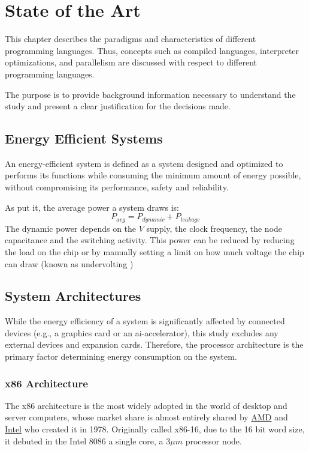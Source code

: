 \chapter{State of the Art}\label{chap:state-of-the-art}

This chapter describes the paradigms and characteristics of different programming languages. Thus, concepts such as compiled languages, interpreter optimizations, and parallelism are discussed with respect to different programming languages.

The purpose is to provide background information necessary to understand the study and present a clear justification for the decisions made.


\section{Energy Efficient Systems}

An energy-efficient system is defined as a system designed and optimized to performs its functions while consuming the minimum amount of energy possible, without compromising its performance, safety and reliability.

As \textcite{Muralidhar2020Energy} put it, the average power a system draws is:
$$P_{avg} = P_{dynamic} + P_{leakage}$$
The dynamic power depends on the $V$ supply, the clock frequency, the node capacitance and the switching activity. This power can be reduced by reducing the load on the chip or by manually setting a limit on how much voltage the chip can draw (known as undervolting \cite{undervolting-effects})


\section{System Architectures}

While the energy efficiency of a system is significantly affected by connected devices (e.g., a graphics card or an \gls{ai-accelerator}), this study excludes any external devices and expansion cards. Therefore, the processor architecture is the primary factor determining energy consumption on the system.

\subsection{x86 Architecture}
The x86 architecture is the most widely adopted in the world of desktop and server computers, whose market share is almost entirely shared by \href{https://amd.com}{AMD} and \href{https://intel.com}{Intel} who created it in 1978. Originally called x86-16, due to the 16 bit word size, it debuted in the Intel 8086 a single core, a $3 \mu m$ processor node.

